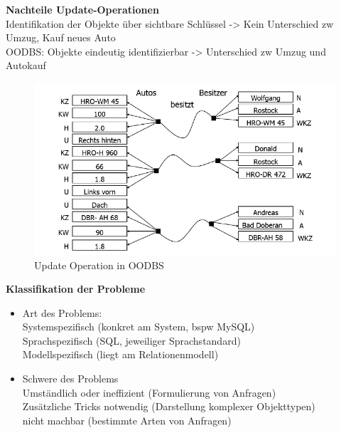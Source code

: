 \textbf{Nachteile Update-Operationen}\\
Identifikation der Objekte über sichtbare Schlüssel -> Kein Unterschied zw Umzug, Kauf neues Auto\\
OODBS: Objekte eindeutig identifizierbar -> Unterschied zw Umzug und Autokauf
\begin{figure}[!h]
	\centering
	\includegraphics[scale=0.6]{img/object_identity.png}
	\caption{Update Operation in OODBS}
\end{figure}
\newpage
\textbf{Klassifikation der Probleme}
\begin{itemize}
	\item Art des Problems:\\
	Systemspezifisch (konkret am System, bspw MySQL)\\
	Sprachspezifisch (SQL, jeweiliger Sprachstandard)\\
	Modellspezifisch (liegt am Relationenmodell)
	
	\item Schwere des Problems\\
	Umständlich oder ineffizient (Formulierung von Anfragen)\\
	Zusätzliche Tricks notwendig (Darstellung komplexer Objekttypen)\\
	nicht machbar (bestimmte Arten von Anfragen)
\end{itemize}
